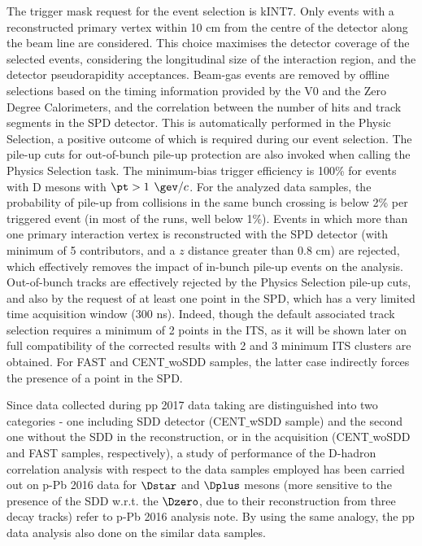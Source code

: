 The trigger mask request for the event selection is kINT7. Only events with a reconstructed primary vertex within 10 cm from the centre of the detector along the beam line are considered. This choice maximises the detector coverage of the selected events, considering the longitudinal size of the interaction region, and
the detector pseudorapidity acceptances. 
Beam-gas events are removed by offline selections based on the timing information provided by the V0 and the Zero Degree Calorimeters, and the correlation between the number of hits and track segments in the SPD detector. This is automatically performed in the Physic Selection, a positive outcome of which is required during our event selection. The pile-up cuts for out-of-bunch pile-up protection are also invoked when calling the Physics Selection task.
The minimum-bias trigger efficiency is 100\% for events with D mesons with $\pt > 1$ $\gev/c$. For the analyzed data samples, the probability of pile-up from collisions in the same bunch crossing is below 2\% per triggered event (in most of the runs, well below 1\%). Events in which more than one primary interaction vertex is reconstructed with the SPD detector (with minimum of 5 contributors, and a $z$ distance greater than 0.8 cm) are rejected, which effectively removes the impact of in-bunch pile-up events on the analysis. Out-of-bunch tracks are effectively rejected by the Physics Selection pile-up cuts, and also by the request of at least one point in the SPD, which has a very limited time acquisition window (300 ns). Indeed, though the default associated track selection requires a minimum of 2 points in the ITS, as it will be shown later on full compatibility of the corrected results with 2 and 3 minimum ITS clusters are obtained. For FAST and CENT$\_$woSDD samples, the latter case indirectly forces the presence of a point in the SPD.

Since data collected during pp 2017 data taking are distinguished into two categories - one including SDD detector (CENT$\_$wSDD sample) and the second one without the SDD in the reconstruction, or in the acquisition (CENT$\_$woSDD and FAST samples, respectively), a study of performance of the D-hadron correlation analysis with respect to the data samples employed has been carried out on p-Pb 2016 data for $\Dstar$ and $\Dplus$ mesons (more sensitive to the presence of the SDD w.r.t. the $\Dzero$, due to their reconstruction from three decay tracks) refer to p-Pb 2016 analysis note. By using the same analogy, the pp data analysis also done on the similar data samples.


